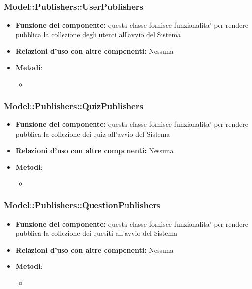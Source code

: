 \subsubsection{Model::Publishers::UserPublishers}
\begin{itemize}
\item\textbf{Funzione del componente:} questa classe fornisce funzionalita' per rendere pubblica la collezione degli utenti all'avvio del Sistema
\item\textbf{Relazioni d'uso con altre componenti:} Nessuna \\
\item\textbf{Metodi}:
	\begin{itemize}
		\item{}\\
	\end{itemize}
\end{itemize}

\subsubsection{Model::Publishers::QuizPublishers}
\begin{itemize}
\item\textbf{Funzione del componente:} questa classe fornisce funzionalita' per rendere pubblica la collezione dei quiz all'avvio del Sistema
\item\textbf{Relazioni d'uso con altre componenti:} Nessuna \\
\item\textbf{Metodi}:
	\begin{itemize}
		\item{}\\
	\end{itemize}
\end{itemize}

\subsubsection{Model::Publishers::QuestionPublishers}
\begin{itemize}
\item\textbf{Funzione del componente:} questa classe fornisce funzionalita' per rendere pubblica la collezione dei quesiti all'avvio del Sistema
\item\textbf{Relazioni d'uso con altre componenti:} Nessuna \\
\item\textbf{Metodi}:
	\begin{itemize}
		\item{}\\
	\end{itemize}
\end{itemize}